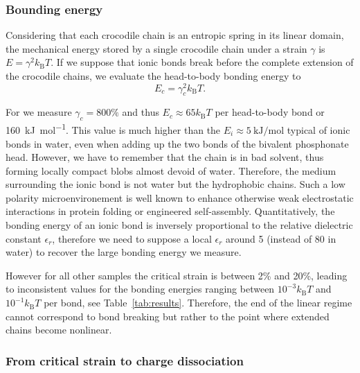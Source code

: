 \documentclass[journal=jacsat,manuscript=article]{achemso}
\begin{document}
\subsubsection{Bounding energy}

Considering that each crocodile chain is an entropic spring in its linear domain, the mechanical energy stored by a single crocodile chain under a strain $\gamma$ is $E = \gamma^2 k_\mathrm{B}T$. If we suppose that ionic bonds break before the complete extension of the crocodile chains, we evaluate the head-to-body bonding energy to
\begin{equation}
E_c = \gamma_c^2 k_\mathrm{B}T.
\label{eq:Ec}
\end{equation}

For  we measure $\gamma_c = 800\%$ and thus $E_c \approx 65 k_\mathrm{B}T$ per head-to-body bond or \SI{160}{\kilo\joule\per\mol}. This value is much higher than the $E_i\approx\SI{5}{\kilo\joule\per\mol}$ typical of ionic bonds in water\cite{Schneider1992}, even when adding up the two bonds of the bivalent phosphonate head. However, we have to remember that the chain is in bad solvent, thus forming locally compact blobs almost devoid of water. Therefore, the medium surrounding the ionic bond is not water but the hydrophobic chains. Such a low polarity microenvironement is well known to enhance otherwise weak electrostatic interactions in protein folding or engineered self-assembly\cite{Rehm2010}. Quantitatively, the bonding energy of an ionic bond is inversely proportional to the relative dielectric constant $\epsilon_r$, therefore we need to suppose a local $\epsilon_r$ around 5 (instead of 80 in water) to recover the large bonding energy we measure.

However for all other samples the critical strain is between 2\% and 20\%, leading to inconsistent values for the bonding energies ranging between $10^{-3}k_\mathrm{B}T$ and $10^{-1}k_\mathrm{B}T$ per bond, see Table~\ref{tab:results}. Therefore, the end of the linear regime cannot correspond to bond breaking but rather to the point where extended chains become nonlinear.


\subsubsection{From critical strain to charge dissociation}
\end{document}
